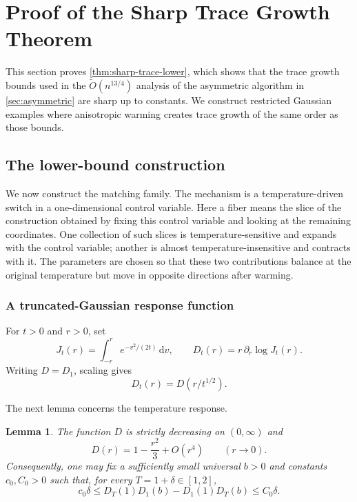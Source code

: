 \documentclass[11pt]{article}
\numberwithin{equation}{section}
\newtheorem{lemma}{Lemma}[section]
\theoremstyle{definition}
\renewcommand{\O}{\widetilde{O}}
\begin{document}
\appendix

\section{Proof of the Sharp Trace Growth Theorem}
\label{sec:sharp}

This section proves \cref{thm:sharp-trace-lower}, which shows that the trace
growth bounds used in the $\O(n^{13/4})$ analysis of the asymmetric algorithm
in \cref{sec:asymmetric} are sharp up to constants.
We construct restricted Gaussian examples where anisotropic warming creates
trace growth of the same order as those bounds.

\subsection{The lower-bound construction}
\label{app:warming:sec:lower-bound}

We now construct the matching family.
The mechanism is a temperature-driven switch in a one-dimensional control
variable.
Here a fiber means the slice of the construction obtained by fixing this control
variable and looking at the remaining coordinates.
One collection of such slices is temperature-sensitive and expands with the
control variable; another is almost temperature-insensitive and contracts with
it.
The parameters are chosen so that these two contributions balance at the
original temperature but move in opposite directions after warming.

\subsubsection{A truncated-Gaussian response function}
\label{app:warming:sec:response-function}

For $t>0$ and
$r>0$, set
\begin{equation}
J_t(r)=\int_{-r}^{r}e^{-v^2/(2t)}\,\mathrm dv,
\qquad
D_t(r)=r\,\partial_r\log J_t(r).
\label{app:warming:eq:J-D}
\end{equation}
Writing $D=D_1$, scaling gives
\begin{equation}
  D_t(r)=D(r/t^{1/2}).
  \label{app:warming:eq:D-scaling}
\end{equation}

The next lemma concerns the temperature response.

\begin{lemma}
\label{app:warming:lem:temperature-response}
The function $D$ is strictly decreasing on
$(0,\infty)$ and
\begin{equation}
  D(r)=1-\frac{r^2}{3}+O(r^4)
  \qquad (r\to0).
  \label{app:warming:eq:D-expansion}
\end{equation}
Consequently, one may fix a sufficiently small universal $b>0$ and constants
$c_0,C_0>0$ such that, for every
$T=1+\delta\in[1,2]$,
\begin{equation}
c_0\delta
\leq D_T(1)D_1(b)-D_1(1)D_T(b)
\leq C_0\delta.
\label{app:warming:eq:temperature-response}
\end{equation}
\end{lemma}
\end{document}
